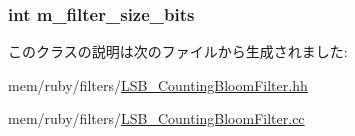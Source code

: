 \label{classLSB__CountingBloomFilter_af53abddc4707ab403450239a6e94c486}
\hypertarget{classLSB__CountingBloomFilter_a5c26703945ae76ff80ec6951cccea29c}{
\subsubsection[{m\_\-filter\_\-size\_\-bits}]{\setlength{\rightskip}{0pt plus 5cm}int {\bf m\_\-filter\_\-size\_\-bits}}}
\label{classLSB__CountingBloomFilter_a5c26703945ae76ff80ec6951cccea29c}


このクラスの説明は次のファイルから生成されました:\begin{DoxyCompactItemize}
\item 
mem/ruby/filters/\hyperlink{LSB__CountingBloomFilter_8hh}{LSB\_\-CountingBloomFilter.hh}\item 
mem/ruby/filters/\hyperlink{LSB__CountingBloomFilter_8cc}{LSB\_\-CountingBloomFilter.cc}\end{DoxyCompactItemize}

